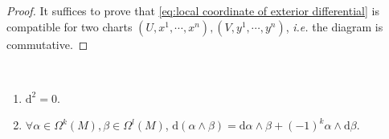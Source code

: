 \begin{proof}
    It suffices to prove that \eqref{eq:local coordinate of exterior differential} is compatible for two charts  $ (U,x^1,\cdots,x^n),(V,y^1,\cdots,y^n) $, \textit{i.e.} the diagram is commutative.
    
    {
    \footnotesize
    }
\end{proof}
\begin{theorem}
    \,
    \begin{enumerate}[label=(\arabic*)]
        \item $ \mathrm{d}^2=0 $.
        \item  $ \forall \alpha\in \Omega^k(M),\beta\in \Omega^l(M) $,  $ \mathrm{d}(\alpha\wedge\beta)=\mathrm{d}\alpha\wedge\beta+(-1)^{k}\alpha\wedge\mathrm{d}\beta $.
    \end{enumerate}
\end{theorem}
